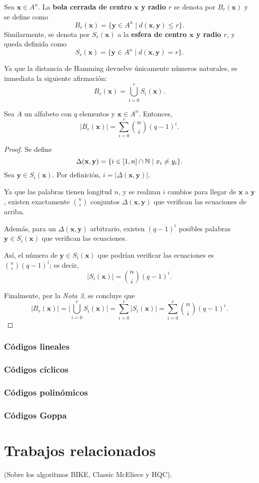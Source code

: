 \begin{definition}
	Sea $\textbf{x} \in A^n$. La \textbf{bola cerrada de centro $\textbf{x}$ y radio $r$} se denota por $B_r(\textbf{x})$ y se define como
	\[B_r(\textbf{x}) = \{\textbf{y} \in A^n \mid d(\textbf{x}, \textbf{y}) \leq r\}.\]
	Similarmente, se denota por $S_r(\textbf{x})$ a la \textbf{esfera de centro $\textbf{x}$ y radio $r$}, y queda definida como
	\[S_r(\textbf{x}) = \{\textbf{y} \in A^n \mid d(\textbf{x}, \textbf{y}) = r\}.\]
	\begin{remark}
		Ya que la distancia de Hamming devuelve únicamente números naturales, es inmediata la siguiente afirmación:
		\[B_r(\textbf{x}) = \bigcup_{i=0}^r S_i(\textbf{x}).\]
	\end{remark}
\end{definition}

\begin{theorem}
	Sea $A$ un alfabeto con $q$ elementos y $\textbf{x} \in A^n$. Entonces,
	\[|B_r(\textbf{x})| = \sum_{i=0}^r\binom{n}{i}(q - 1)^i.\]
\end{theorem}

\begin{proof}
	Se define
	\[\Delta(\textbf{x}, \textbf{y}) = \{i\in[1,n]\cap\mathbb{N} \mid x_i \neq y_i\}.\]
	Sea $\textbf{y} \in S_i(\textbf{x})$. Por definición, $i = |\Delta(\textbf{x}, \textbf{y})|$.
	
	Ya que las palabras tienen longitud $n$, y se realizan $i$ cambios para llegar de $\textbf{x}$ a $\textbf{y}$, existen exactamente $\binom{n}{i}$ conjuntos $\Delta(\textbf{x}, \textbf{y})$ que verifican las ecuaciones de arriba.
	
	Además, para un $\Delta(\textbf{x}, \textbf{y})$ arbitrario, existen $(q - 1)^i$ posibles palabras $\textbf{y} \in S_i(\textbf{x})$ que verifican las ecuaciones.
	
	Así, el número de $\textbf{y} \in S_i(\textbf{x})$ que podrían verificar las ecuaciones es $\binom{n}{i}(q - 1)^i$; es decir,
	\[|S_i(\textbf{x})| = \binom{n}{i}(q - 1)^i.\]
	
	Finalmente, por la \textit{Nota 3}, se concluye que
	\[|B_r(\textbf{x})| = \bigg|\bigcup_{i=0}^r S_i(\textbf{x})\bigg| = \sum_{i=0}^r |S_i(\textbf{x})| = \sum_{i=0}^r\binom{n}{i}(q - 1)^i.\]
\end{proof}

\subsubsection{Códigos lineales}

\subsubsection{Códigos cíclicos}

\subsubsection{Códigos polinómicos}

\subsubsection{Códigos Goppa}

\section{Trabajos relacionados}

(Sobre los algoritmos BIKE, Classic McEliece y HQC).
